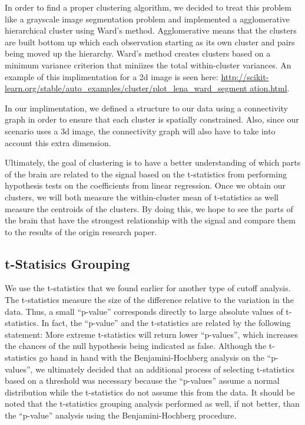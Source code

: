 \par In order to find a proper clustering algorithm, we decided to treat this
problem like a grayscale image segmentation problem and implemented a
agglomerative hierarchical cluster using Ward's method. Agglomerative means
that the clusters are built bottom up which each observation starting as its
own cluster and pairs being moved up the hierarchy. Ward's method creates
clusters based on a minimum variance criterion that miniizes the total
within-cluster variances. An example of this implimentation for a 2d image is
seen here: 
\url{http://scikit-learn.org/stable/auto_examples/cluster/plot_lena_ward_segment
 ation.html}.

In our implimentation, we defined a structure to our data using a connectivity
graph in order to ensure that each cluster is spatially constrained. Also,
since our scenario uses a 3d image, the connectivity graph will also have to
take into account this extra dimension.


\par Ultimately, the goal of clustering is to have a better understanding of 
which parts of the brain are related to the signal based on the t-statistics 
from performing hypothesis tests on the coefficients from linear regression.
Once we obtain our clusters, we will both measure the within-cluster mean of
t-statistics as well measure the centroids of the clusters. By doing this, we hope
to see the parts of the brain that have the strongest relationship with the
signal and compare them to the results of the origin research paper.

\subsection{t-Statisics Grouping}

\par We use the t-statistics that we found earlier for another type of cutoff
analysis. The t-statistics measure the size of the difference relative to the 
variation in the data. Thus, a small ``p-value'' corresponds directly to large
absolute values of t-statistics. In fact, the ``p-value'' and the t-statistics
are related by the following statement: More extreme t-statistics will return 
lower ``p-values'', which increases the chances of the null hypothesis being 
indicated as false. Although the t-statistics go hand in hand with the 
Benjamini-Hochberg analysis on the ``p-values'', we ultimately decided that an 
additional process of selecting t-statistics based on a threshold was 
necessary because the ``p-values'' assume a normal distribution while the 
t-statistics do not assume this from the data. It should be noted that the 
t-statistics grouping analysis performed as well, if not better, than the 
``p-value'' analysis using the Benjamini-Hochberg procedure.

